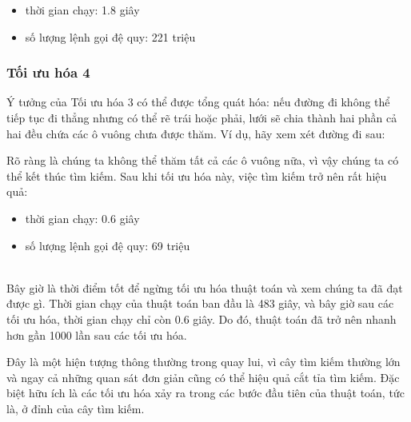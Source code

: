 \begin{itemize}
\item
thời gian chạy: 1.8 giây
\item
số lượng lệnh gọi đệ quy: 221 triệu
\end{itemize}

\subsubsection{Tối ưu hóa 4}

Ý tưởng của Tối ưu hóa 3
có thể được tổng quát hóa:
nếu đường đi không thể tiếp tục đi thẳng
nhưng có thể rẽ trái hoặc phải,
lưới sẽ chia thành hai phần
cả hai đều chứa các ô vuông chưa được thăm.
Ví dụ, hãy xem xét đường đi sau:

\begin{center}
\end{center}
Rõ ràng là chúng ta không thể thăm tất cả các ô vuông nữa,
vì vậy chúng ta có thể kết thúc tìm kiếm.
Sau khi tối ưu hóa này, việc tìm kiếm trở nên
rất hiệu quả:

\begin{itemize}
\item
thời gian chạy: 0.6 giây
\item
số lượng lệnh gọi đệ quy: 69 triệu
\end{itemize}

~\\
Bây giờ là thời điểm tốt để ngừng tối ưu hóa
thuật toán và xem chúng ta đã đạt được gì.
Thời gian chạy của thuật toán ban đầu
là 483 giây,
và bây giờ sau các tối ưu hóa,
thời gian chạy chỉ còn 0.6 giây.
Do đó, thuật toán đã trở nên nhanh hơn gần 1000 lần
sau các tối ưu hóa.

Đây là một hiện tượng thông thường trong quay lui,
vì cây tìm kiếm thường lớn
và ngay cả những quan sát đơn giản cũng có thể hiệu quả
cắt tỉa tìm kiếm.
Đặc biệt hữu ích là các tối ưu hóa
xảy ra trong các bước đầu tiên của thuật toán,
tức là, ở đỉnh của cây tìm kiếm.


